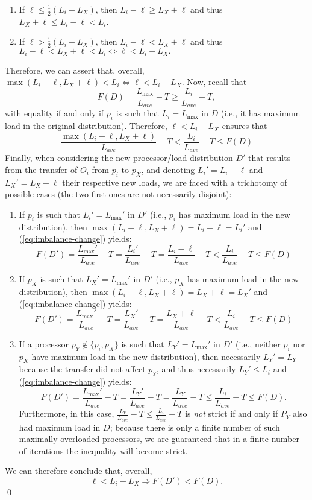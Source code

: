 \begin{enumerate}
\item
If $\ell \le \frac{1}{2}(L_i-L_X)$, then $L_i-\ell\ge{}L_X+\ell$ and
thus $L_X+\ell\le L_i-\ell < L_i$.
\item
If $\ell > \frac{1}{2}(L_i-L_X)$, then $L_i-\ell<L_X+\ell$ and
thus $L_i-\ell < L_X+\ell < L_i \Leftrightarrow \ell < L_i - L_X.$
\end{enumerate}
Therefore, we can assert that, overall,
$\max{(L_i-\ell, L_X+\ell)} < L_i \Leftrightarrow \ell < L_i - L_X$.
Now, recall that
\[
F(D) = \frac{L_{\max}}{L_{ave}} - T
\ge \frac{L_i}{L_{ave}} - T,
\]
with equality if and only if $p_i$ is such that $L_i=L_{\max}$ in $D$
(i.e., it has maximum load in the original distribution).
Therefore, $\ell<L_i-L_X$ ensures that
\begin{equation}
\label{eq:imbalance-change}
\frac{\max{(L_i-\ell, L_X+\ell)}}{L_{ave}} -T
< \frac{L_i}{L_{ave}} - T \le F(D)
\end{equation}
Finally, when considering the new processor/load distribution $D'$ that
results from the transfer of $O_i$ from $p_i$ to $p_X$, and denoting
$L_i'=L_i-\ell$ and $L_X'=L_X+\ell$ their respective new loads, we are faced
with a trichotomy of possible cases (the two first ones are not necessarily disjoint):
\begin{enumerate}
\item
If $p_i$ is such that $L_i'=L_{\max}'$ in $D'$ (i.e., $p_i$ has
maximum load in the new distribution), then
$\max{(L_i-\ell,L_X+\ell)}=L_i-\ell=L_i'$ and
(\ref{eq:imbalance-change}) yields: 
\[
F(D') = \frac{L_{\max}'}{L_{ave}} - T
 = \frac{L_i'}{L_{ave}} - T = \frac{L_i -\ell}{L_{ave}} - T
< \frac{L_i}{L_{ave}} - T \le F(D)
\]
\item
If $p_X$ is such that $L_X'=L_{\max}'$ in $D'$ (i.e., $p_X$ has
maximum load in the new distribution), then
$\max{(L_i-\ell,L_X+\ell)}=L_X+\ell=L_X'$ and
(\ref{eq:imbalance-change}) yields: 
\[
F(D') = \frac{L_{\max}'}{L_{ave}} - T
 = \frac{L_X'}{L_{ave}} - T  = \frac{L_X+\ell}{L_{ave}} - T
< \frac{L_i}{L_{ave}} - T \le F(D)
\]
\item 
If a processor $p_Y\not\in\{p_i,p_X\}$ is such that $L_Y'=L_{\max}'$
in $D'$ (i.e., neither $p_i$ nor $p_X$ have maximum load in the new
distribution), then necessarily $L_Y'=L_Y$ because the transfer did not
affect $p_Y$, and thus necessarily $L_Y'\le{}L_i$ and
(\ref{eq:imbalance-change}) yields: 
\[
F(D') = \frac{L_{\max}'}{L_{ave}} - T
 = \frac{L_Y'}{L_{ave}} - T  = \frac{L_Y}{L_{ave}} - T
\le \frac{L_i}{L_{ave}} - T \le F(D).
\]
Furthermore, in this case, 
$\frac{L_Y}{L_{ave}}-T\le\frac{L_i}{L_{ave}}-T$ is \emph{not} strict
if and only if $P_Y$ also had maximum load in $D$; because there is
only a finite number of such maximally-overloaded processors, we are
guaranteed that in a finite number of iterations the inequality will
become strict.
\end{enumerate}
We can therefore conclude that, overall,
\[
\ell < L_i - L_X \Longrightarrow F(D') < F(D).
\]
\hfill\qed\\

